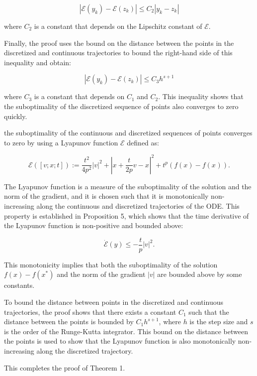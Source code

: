 \begin{enumerate}
$$
|\mathcal{E}(y_k) - \mathcal{E}(z_k)| \le C_2 |y_k - z_k|
$$

    where $C_2$ is a constant that depends on the Lipschitz constant of $\mathcal{E}$.

    Finally, the proof uses the bound on the distance between the points in the discretized and continuous trajectories to bound the right-hand side of this inequality and obtain:

$$
|\mathcal{E}(y_k) - \mathcal{E}(z_k)| \le C_3 h^{s+1}
$$

    where $C_3$ is a constant that depends on $C_1$ and $C_2$. This inequality shows that the suboptimality of the discretized sequence of points also converges to zero quickly.

    the suboptimality of the continuous and discretized sequences of points converges to zero by using a Lyapunov function $\mathcal{E}$ defined as:

$$
\mathcal{E}([v ; x ; t]):=\frac{t^{2}}{4 p^{2}}|v|^{2}+\left|x+\frac{t}{2 p} v-x^{}\right|^{2}+t^{p}\left(f(x)-f\left(x^{}\right)\right) .
$$

The Lyapunov function is a measure of the suboptimality of the solution and the norm of the gradient, and it is chosen such that it is monotonically non-increasing along the continuous and discretized trajectories of the ODE. This property is established in Proposition 5, which shows that the time derivative of the Lyapunov function is non-positive and bounded above:

$$
\dot{\mathcal{E}}(y) \leq-\frac{t}{p}|v|^{2} .
$$

This monotonicity implies that both the suboptimality of the solution $f(x) - f(x^*)$ and the norm of the gradient $|v|$ are bounded above by some constants.

To bound the distance between points in the discretized and continuous trajectories, the proof shows that there exists a constant $C_1$ such that the distance between the points is bounded by $C_1 h^{s+1}$, where $h$ is the step size and $s$ is the order of the Runge-Kutta integrator. This bound on the distance between the points is used to show that the Lyapunov function is also monotonically non-increasing along the discretized trajectory.



    This completes the proof of Theorem 1.
\end{enumerate}
\newpage 

